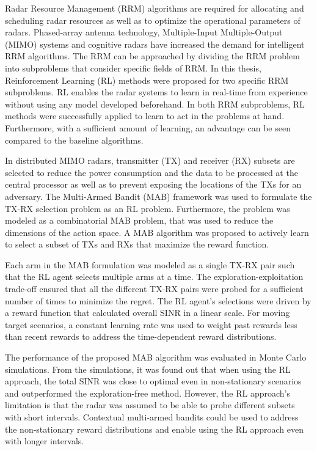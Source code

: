 \documentclass[english, 12pt, a4paper, elec, utf8, a-1b, online]{aaltothesis}
\begin{document}
Radar Resource Management (RRM) algorithms are required for allocating and scheduling radar resources as well as to optimize the operational parameters of radars.  
Phased-array antenna technology, Multiple-Input Multiple-Output (MIMO) systems and cognitive radars have increased the demand for intelligent RRM algorithms.
The RRM can be approached by dividing the RRM problem into subproblems that consider specific fields of RRM.
In this thesis, Reinforcement Learning (RL) methods were proposed for two specific RRM subproblems.
RL enables the radar systems to learn in real-time from experience without using any model developed beforehand.
In both RRM subproblems, RL methods were successfully applied to learn to act in the problems at hand. 
Furthermore, with a sufficient amount of learning, an advantage can be seen compared to the baseline algorithms.

In distributed MIMO radars, transmitter (TX) and receiver (RX) subsets are selected to reduce the power consumption and the data to be processed at the central processor as well as to prevent exposing the locations of the TXs for an adversary.
The Multi-Armed Bandit (MAB) framework was used to formulate the TX-RX selection problem as an RL problem.
Furthermore, the problem was modeled as a combinatorial MAB problem, that was used to reduce the dimensions of the action space.
A MAB algorithm was proposed to actively learn to select a subset of TXs and RXs that maximize the reward function.

Each arm in the MAB formulation was modeled as a single TX-RX pair such that the RL agent selects multiple arms at a time. 
The exploration-exploitation trade-off ensured that all the different TX-RX pairs were probed for a sufficient number of times to minimize the regret. 
The RL agent's selections were driven by a reward function that calculated overall SINR in a linear scale.
For moving target scenarios, a constant learning rate was used to weight past rewards less than recent rewards to address the time-dependent reward distributions.

The performance of the proposed MAB algorithm was evaluated in Monte Carlo simulations. 
From the simulations, it was found out that when using the RL approach, the total SINR was close to optimal even in non-stationary scenarios and outperformed the exploration-free method. 
However, the RL approach's limitation is that the radar was assumed to be able to probe different subsets with short intervals.
Contextual multi-armed bandits \cite{Lu2010} could be used to address the non-stationary reward distributions and enable using the RL approach even with longer intervals. 
\end{document}
